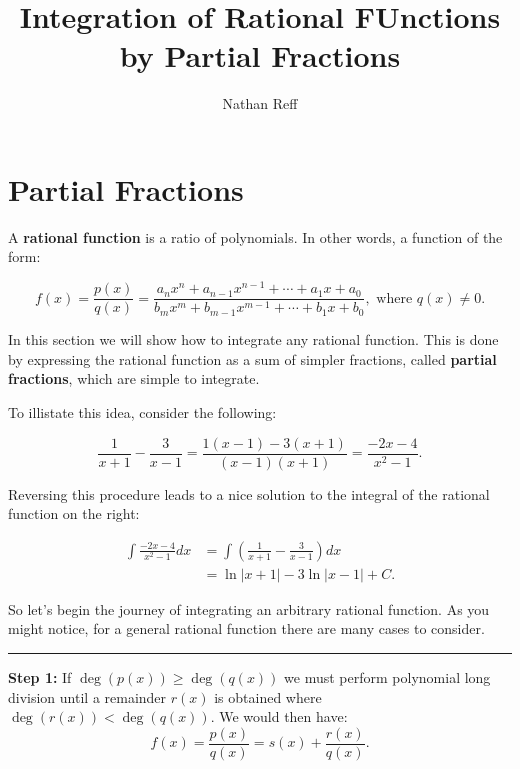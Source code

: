 \documentclass[reqno]{amsart}
\theoremstyle{definition}
\numberwithin{equation}{section}
\begin{document}
\title{Integration of Rational FUnctions by Partial Fractions}
 
\author{Nathan Reff}
\address{Department of Mathematics\\Alfred University\\ Alfred, NY 14802, U.S.A.}

\maketitle

\section{Partial Fractions}

A {\bf rational function} is a ratio of polynomials.  In other words, a function of the form:

\[ f(x) = \frac{p(x)}{q(x)} = \frac{a_nx^n +a_{n-1}x^{n-1} +\cdots + a_1x +a_0}{b_mx^m +b_{m-1}x^{m-1} +\cdots + b_1x +b_0}, \text{   where } q(x)\neq0.\]

In this section we will show how to integrate any rational function.  This is done by expressing the rational function as a sum of simpler fractions, called {\bf partial fractions}, which are simple to integrate.

To illistate this idea, consider the following:

\[ \frac{1}{x+1} - \frac{3}{x-1} = \frac{1(x-1)-3(x+1)}{(x-1)(x+1)} = \frac{-2x-4}{x^2-1}. \]

Reversing this procedure leads to a nice solution to the integral of the rational function on the right:

\begin{align*}
\int \frac{-2x-4}{x^2-1} dx &= \int  \left(\frac{1}{x+1} - \frac{3}{x-1}\right) dx \\
&= \ln|x+1|-3\ln|x-1|+C.
\end{align*}

So let's begin the journey of integrating an arbitrary rational function.  As you might notice, for a general rational function there are many cases to consider.
\hrule
\vspace{1pc}

{\bf Step 1:}  If $\deg(p(x))\geq \deg(q(x))$ we must perform polynomial long division until a remainder $r(x)$ is obtained where $\deg(r(x))<\deg(q(x))$.  We would then have:
\[ f(x) = \frac{p(x)}{q(x)} = s(x)+\frac{r(x)}{q(x)}. \]
 
\end{document}
